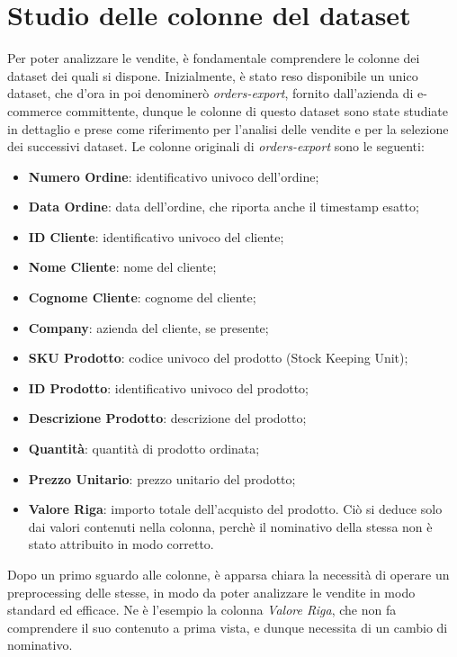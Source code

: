 \section{Studio delle colonne del dataset}
\label{sec:studio-colonne-dataset}
Per poter analizzare le vendite, è fondamentale comprendere le colonne dei dataset dei quali si dispone. Inizialmente, è stato reso disponibile un unico dataset, che d'ora in poi denominerò \emph{orders-export}, fornito dall'azienda di e-commerce committente, dunque le colonne di questo dataset sono state studiate in dettaglio e prese come riferimento per l'analisi delle vendite e per la selezione dei successivi dataset. Le colonne originali di \emph{orders-export} sono le seguenti:
\begin{itemize}
    \item \textbf{Numero Ordine}: identificativo univoco dell'ordine;
    \item \textbf{Data Ordine}: data dell'ordine, che riporta anche il timestamp esatto;
    \item \textbf{ID Cliente}: identificativo univoco del cliente;
    \item \textbf{Nome Cliente}: nome del cliente;
    \item \textbf{Cognome Cliente}: cognome del cliente;
    \item \textbf{Company}: azienda del cliente, se presente;
    \item \textbf{SKU Prodotto}: codice univoco del prodotto (Stock Keeping Unit);
    \item \textbf{ID Prodotto}: identificativo univoco del prodotto;
    \item \textbf{Descrizione Prodotto}: descrizione del prodotto;
    \item \textbf{Quantità}: quantità di prodotto ordinata;
    \item \textbf{Prezzo Unitario}: prezzo unitario del prodotto;
    \item \textbf{Valore Riga}: importo totale dell'acquisto del prodotto. Ciò si deduce solo dai valori contenuti nella colonna, perchè il nominativo della stessa non è stato attribuito in modo corretto.
\end{itemize}

Dopo un primo sguardo alle colonne, è apparsa chiara la necessità di operare un \gls{preprocessing}\glsfirstoccur{} delle stesse, in modo da poter analizzare le vendite in modo standard ed efficace. Ne è l'esempio la colonna \emph{Valore Riga}, che non fa comprendere il suo contenuto a prima vista, e dunque necessita di un cambio di nominativo.

